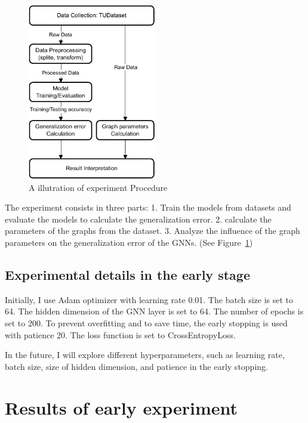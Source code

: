 \documentclass{article}
\begin{document}
\begin{figure}[h]
    \centering
    \includegraphics[width=0.5\textwidth]{experiment_procedure.pdf}
    \caption{A illutration of experiment Procedure}
    \label{fig:experiment}
\end{figure}

The experiment consists in three parts: 1. Train the models from datasets and evaluate the models to calculate the generalization error. 2. calculate the parameters of the graphs from the dataset. 3. Analyze the influence of the graph parameters on the generalization error of the GNNs. (See Figure~\ref{fig:experiment})


\subsection{Experimental details in the early stage}
Initially, I use Adam optimizer with learning rate 0.01. The batch size is set to 64. The hidden dimension of the GNN layer is set to 64. The number of epochs is set to 200. To prevent overfitting and to save time, the early stopping is used with patience 20. The loss function is set to CrossEntropyLoss. 

In the future, I will explore different hyperparameters, such as learning rate, batch size, size of hidden dimension, and patience in the early stopping.



\section{Results of early experiment} \label{sec:results}
\end{document}
